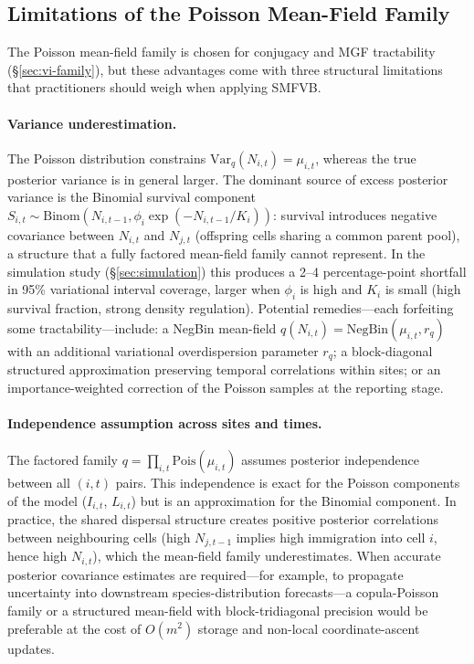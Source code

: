 \documentclass[review,12pt]{elsarticle}
\theoremstyle{definition}
\begin{document}
\subsection{Limitations of the Poisson Mean-Field Family}
\label{sec:limitations-mf}

The Poisson mean-field family is chosen for conjugacy and
MGF tractability (\S\ref{sec:vi-family}), but these advantages come with
three structural limitations that practitioners should weigh when applying
SMFVB.

\paragraph{Variance underestimation.}
The Poisson distribution constrains $\mathrm{Var}_q(N_{i,t})=\mu_{i,t}$,
whereas the true posterior variance is in general larger.  The dominant
source of excess posterior variance is the Binomial survival component
$S_{i,t}\sim\mathrm{Binom}(N_{i,t-1},\phi_i\exp(-N_{i,t-1}/K_i))$: survival
introduces negative covariance between $N_{i,t}$ and $N_{j,t}$ (offspring
cells sharing a common parent pool), a structure that a fully factored
mean-field family cannot represent.  In the simulation study
(\S\ref{sec:simulation}) this produces a 2--4 percentage-point shortfall in
95\% variational interval coverage, larger when $\phi_i$ is high and $K_i$ is
small (high survival fraction, strong density regulation).  Potential
remedies---each forfeiting some tractability---include: a NegBin mean-field
$q(N_{i,t})=\mathrm{NegBin}(\mu_{i,t},r_q)$ with an additional variational
overdispersion parameter $r_q$; a block-diagonal structured approximation
preserving temporal correlations within sites; or an importance-weighted
correction of the Poisson samples at the reporting stage.

\paragraph{Independence assumption across sites and times.}
The factored family $q=\prod_{i,t}\mathrm{Pois}(\mu_{i,t})$ assumes
posterior independence between all $(i,t)$ pairs.  This independence is
exact for the Poisson components of the model ($I_{i,t}$, $L_{i,t}$) but
is an approximation for the Binomial component.  In practice, the
shared dispersal structure creates positive posterior correlations between
neighbouring cells (high $N_{j,t-1}$ implies high immigration into cell $i$,
hence high $N_{i,t}$), which the mean-field family underestimates.  When
accurate posterior covariance estimates are required---for example, to
propagate uncertainty into downstream species-distribution forecasts---a
copula-Poisson family \citep{tran2015} or a structured mean-field with
block-tridiagonal precision \citep{opper2009} would be preferable at the
cost of $O(m^2)$ storage and non-local coordinate-ascent updates.
\end{document}
